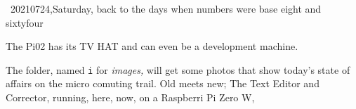 \ 20210724,Saturday, back to the days when numbers were base eight and sixtyfour

The Pi02 has its TV HAT and can even be a development machine. %

The folder, named {\tt i} for {\it images,} will get some photos that show today's
state of affairs on the micro comuting trail.  Old meets new; The Text Editor and
Corrector, running, here, now, on a Raspberri Pi Zero W, %

\bye
